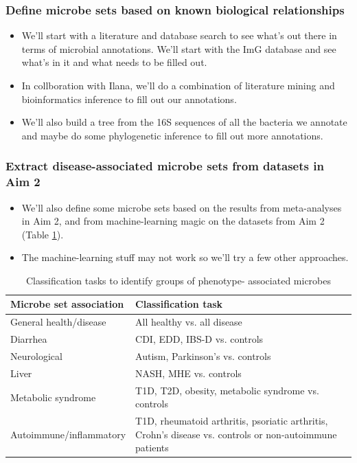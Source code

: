 \documentclass[12pt]{article}
\begin{document}
\subsubsection{Define microbe sets based on known biological relationships}

\begin{itemize}
\item We'll start with a literature and database search to see what's out there in terms 
of microbial annotations. We'll start with the ImG database and see what's in it and 
what needs to be filled out.
\item In collboration with Ilana, we'll do a combination of literature mining and 
bioinformatics inference to fill out our annotations.
\item We'll also build a tree from the 16S sequences of all the bacteria we annotate and 
maybe do some phylogenetic inference to fill out more annotations.
\end{itemize}

\subsubsection{Extract disease-associated microbe sets from datasets in Aim 2}

\begin{itemize}
\item We'll also define some microbe sets based on the results from meta-analyses in Aim 2, and from machine-learning magic on the datasets from Aim 2 (Table \ref{tab:classifications}).
\item The machine-learning stuff may not work so we'll try a few other approaches. 
\end{itemize}

\begin{table}[H]
\begin{center}
\begin{tabular}{|p{6cm}|p{10cm}|}
	\hline
	\textbf{Microbe set association} & \textbf{Classification task} \\
	\hline
	General health/disease & All healthy vs. all disease \\
	\hline
	Diarrhea & CDI, EDD, IBS-D vs. controls \\
	\hline
	Neurological & Autism, Parkinson's vs. controls \\
	\hline
	Liver & NASH, MHE vs. controls\\
	\hline
	Metabolic syndrome & T1D, T2D, obesity, metabolic syndrome vs. 
	controls \\
	\hline
	Autoimmune/inflammatory & T1D, rheumatoid arthritis, psoriatic arthritis, Crohn's disease 
	vs. controls or non-autoimmune patients \\
	\hline
\end{tabular}
\caption{Classification tasks to identify groups of phenotype-
associated microbes}\label{tab:classifications}
\end{center}
\end{table}
\end{document}
